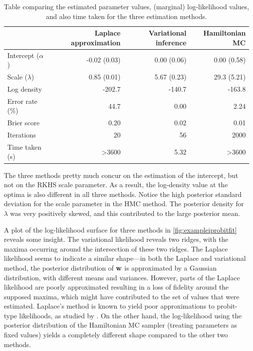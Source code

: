 \begin{table}[hbt]
\centering
\caption{Table comparing the estimated parameter values, (marginal) log-likelihood values, and also time taken for the three estimation methods.}
\label{tab:compreiprobit}
\begin{tabular}{@{}lrrr@{}}
\toprule
& Laplace approximation 
& Variational inference 
& Hamiltonian MC          \\ \midrule
Intercept ($\alpha$)      & -0.02 (0.03)           & 0.00 (0.06)    & 0.00 (0.58)  \\
Scale ($\lambda$)      & 0.85 (0.01)         & 5.67 (0.23)  & 29.3 (5.21)     \\[0.5em]
Log density    & -202.7              & -140.7       & -163.8                  \\
Error rate (\%) & 44.7               & 0.00        & 2.24                   \\
Brier score & 0.20               & 0.02        & 0.01                   \\[0.5em]
Iterations     & 20                  & 56          & 2000                    \\
Time taken (s) & >3600                & 5.32         & >3600                     \\ \bottomrule
\end{tabular}
\end{table}

The three methods pretty much concur on the estimation of the intercept, but not on the RKHS scale parameter.
As a result, the log-density value at the optima is also different in all three methods.
Notice the high posterior standard deviation for the scale parameter in the HMC method.
The posterior density for $\lambda$ was very positively skewed, and this contributed to the large posterior mean.

A plot of the log-likelihood surface for three methods in \cref{fig:exampleiprobitfit} reveals some insight.
The variational likelihood reveals two ridges, with the maxima occurring around the intersection of these two ridges.
The Laplace likelihood seems to indicate a similar shape---in both the Laplace and variational method, the posterior distribution of ${\mathbf w}$ is approximated by a Gaussian distribution, with different means and variances.
However, parts of the Laplace likelihood are poorly approximated resulting in a loss of fidelity around the supposed maxima, which might have contributed to the set of values that were estimated.
Laplace's method is known to yield poor approximations to probit-type likelihoods, as studied by \citet{kuss2005assessing}.
On the other hand, the log-likelihood using the posterior distribution of the Hamiltonian MC sampler (treating parameters as fixed values) yields a completely different shape compared to the other two methods.

